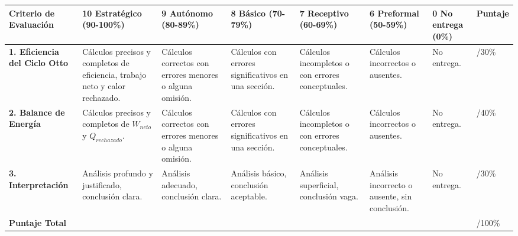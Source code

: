 \documentclass{article}
\begin{document}
\begin{tabularx}{\textwidth}{|X|X|X|X|X|X|X|X|}
\hline
\textbf{Criterio de Evaluación} & \textbf{10 Estratégico (90-100\%)} & \textbf{9 Autónomo (80-89\%)} & \textbf{8 Básico (70-79\%)} & \textbf{7 Receptivo (60-69\%)} & \textbf{6 Preformal (50-59\%)} & \textbf{0 No entrega (0\%)} & \textbf{Puntaje} \\
\hline
\textbf{1. Eficiencia del Ciclo Otto} & Cálculos precisos y completos de eficiencia, trabajo neto y calor rechazado. & Cálculos correctos con errores menores o alguna omisión. & Cálculos con errores significativos en una sección. & Cálculos incompletos o con errores conceptuales. & Cálculos incorrectos o ausentes. & No entrega. & /30\% \\
\hline
\textbf{2. Balance de Energía} & Cálculos precisos y completos de $W_{neto}$ y $Q_{rechazado}$. & Cálculos correctos con errores menores o alguna omisión. & Cálculos con errores significativos en una sección. & Cálculos incompletos o con errores conceptuales. & Cálculos incorrectos o ausentes. & No entrega. & /40\% \\
\hline
\textbf{3. Interpretación} & Análisis profundo y justificado, conclusión clara. & Análisis adecuado, conclusión clara. & Análisis básico, conclusión aceptable. & Análisis superficial, conclusión vaga. & Análisis incorrecto o ausente, sin conclusión. & No entrega. & /30\% \\
\hline
\textbf{Puntaje Total} & & & & & & & /100\% \\
\hline
\end{tabularx}
\end{document}
